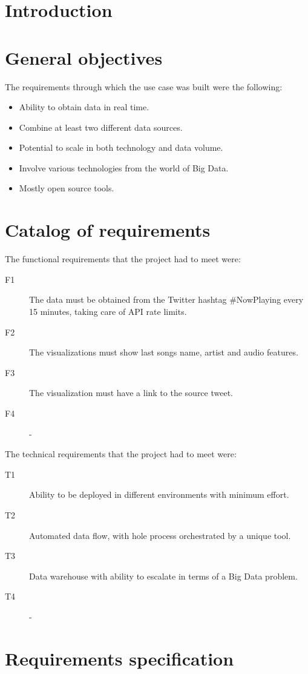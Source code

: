 
\section{Introduction}

\section{General objectives}

\nonzeroparskip The requirements through which the use case was built were the following:
\begin{itemize}
	\item Ability to obtain data in real time.
	\item Combine at least two different data sources.
	\item Potential to scale in both technology and data volume.
	\item Involve various technologies from the world of Big Data.
	\item Mostly open source tools.
\end{itemize}

\section{Catalog of requirements}

\nonzeroparskip The functional requirements that the project had to meet were:
\begin{description}
	\item[F1] The data must be obtained from the Twitter hashtag \#NowPlaying every 15 minutes, taking care of API rate limits.
	\item[F2] The visualizations must show last songs name, artist and audio features.
	\item[F3] The visualization must have a link to the source tweet.
	\item[F4] -
\end{description}

\nonzeroparskip The technical requirements that the project had to meet were:
\begin{description}
	\item[T1] Ability to be deployed in different environments with minimum effort.
	\item[T2] Automated data flow, with hole process orchestrated by a unique tool.
	\item[T3] Data warehouse with ability to escalate in terms of a Big Data problem.
	\item[T4] -
\end{description}

\section{Requirements specification}


